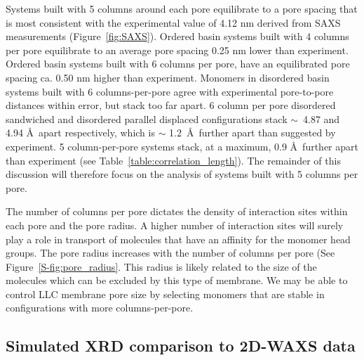 \documentclass[journal=jpcbfk,manuscript=article]{achemso}
\begin{document}
  Systems built with 5 columns around each pore equilibrate to a pore spacing
  that is most consistent with the experimental value of 4.12 nm derived from
  SAXS measurements (Figure~\ref{fig:SAXS}). Ordered basin systems built with 4
  columns per pore equilibrate to an average pore spacing 0.25 nm lower than
  experiment. Ordered basin systems built with 6 columns per pore, have an
  equilibrated pore spacing ca. 0.50 nm higher than experiment. Monomers in
  disordered basin systems built with 6 columns-per-pore agree with experimental
  pore-to-pore distances within error, but stack too far apart. 6
  column per pore disordered sandwiched and disordered parallel displaced
  configurations stack $\sim$~4.87 and 4.94 \AA~apart respectively, which is
  $\sim$ 1.2~\AA~further apart than suggested by experiment. 5 column-per-pore
  systems stack, at a maximum, 0.9 \AA~further apart than experiment (see
  Table~\ref{table:correlation_length}). The remainder of this discussion will
  therefore focus on the analysis of systems built with 5 columns per pore. 
  
  The number of columns per pore dictates the density of interaction sites within
  each pore and the pore radius. A higher number of interaction sites will 
  surely play a role in transport of molecules that have an affinity for the monomer
  head groups. 
  The pore radius increases with the number of 
  columns per pore (See Figure~\ref{S-fig:pore_radius}. This radius is likely 
  related to the size of the molecules which can be excluded by this type of 
  membrane. We may be able to control LLC membrane pore size by selecting monomers
  that are stable in configurations with more columns-per-pore.

  \subsection{Simulated XRD comparison to 2D-WAXS data}
\end{document}
